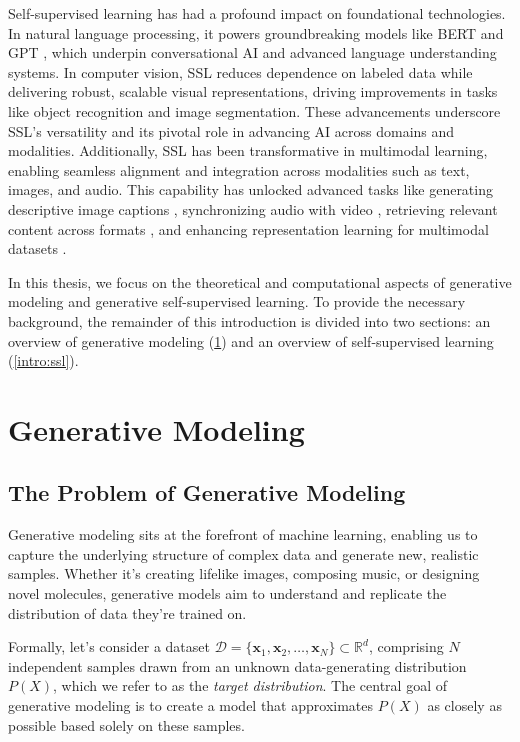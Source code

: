 Self-supervised learning has had a profound impact on foundational technologies. In natural language processing, it powers groundbreaking models like BERT \cite{devlin2018bert} and GPT \cite{brown2020language}, which underpin conversational AI and advanced language understanding systems. In computer vision, SSL reduces dependence on labeled data while delivering robust, scalable visual representations, driving improvements in tasks like object recognition and image segmentation. These advancements underscore SSL’s versatility and its pivotal role in advancing AI across domains and modalities. Additionally, SSL has been transformative in multimodal learning, enabling seamless alignment and integration across modalities such as text, images, and audio. This capability has unlocked advanced tasks like generating descriptive image captions \cite{hossain2019comprehensive}, synchronizing audio with video \cite{arandjelovic2017look}, retrieving relevant content across formats \cite{sun2019videobert}, and enhancing representation learning for multimodal datasets \cite{radford2021learning}.

In this thesis, we focus on the theoretical and computational aspects of generative modeling and generative self-supervised learning. To provide the necessary background, the remainder of this introduction is divided into two sections: an overview of generative modeling (\ref{intro:generative_modeling}) and an overview of self-supervised learning (\ref{intro:ssl}).


\section{Generative Modeling}\label{intro:generative_modeling}
\subsection{The Problem of Generative Modeling}

Generative modeling sits at the forefront of machine learning, enabling us to capture the underlying structure of complex data and generate new, realistic samples. Whether it's creating lifelike images, composing music, or designing novel molecules, generative models aim to understand and replicate the distribution of data they're trained on.

Formally, let's consider a dataset \( \mathcal{D} = \{ \mathbf{x}_1, \mathbf{x}_2, \dots, \mathbf{x}_N \} \subset \mathbb{R}^d \), comprising \( N \) independent samples drawn from an unknown data-generating distribution \( P(X) \), which we refer to as the \textit{target distribution}. The central goal of generative modeling is to create a model that approximates \( P(X) \) as closely as possible based solely on these samples.


